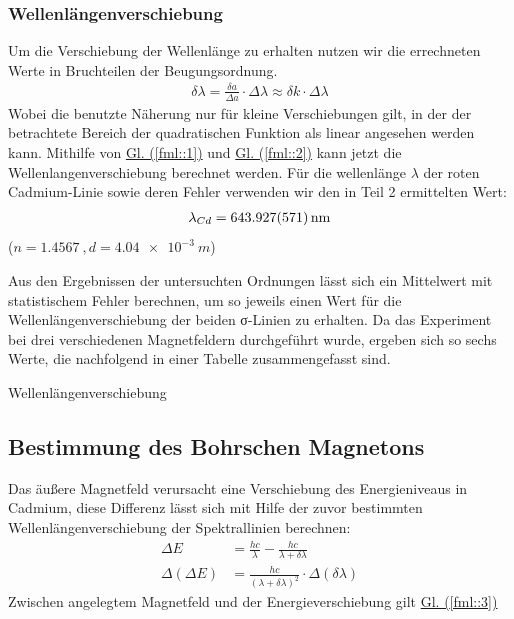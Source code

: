      \subsubsection{Wellenlängenverschiebung}
        Um die Verschiebung der Wellenlänge zu erhalten nutzen wir die errechneten Werte in Bruchteilen der Beugungsordnung.
        \begin{align}
          \delta \lambda = \frac{\delta a}{\Delta a}\cdot \Delta \lambda \approx \delta k\cdot \Delta\lambda \label{fml::2}
        \end{align}
        Wobei die benutzte Näherung nur für kleine Verschiebungen gilt, in der der betrachtete Bereich der quadratischen Funktion als linear angesehen werden kann. Mithilfe von \hyperref[fml::1]{Gl. (\ref*{fml::1})} %
        und \hyperref[fml::2]{Gl. (\ref*{fml::2})} kann jetzt die Wellenlangenverschiebung berechnet werden. Für die wellenlänge $\lambda$ der roten Cadmium-Linie sowie deren Fehler verwenden wir den in Teil 2 ermittelten Wert:
        \begin{align}
          \lambda_{Cd} = \SI{643.927+-0.571}{\nano\metre}
        \end{align}
        ($n = \SI{1.4567}{}, d=\SI{4.04e-3}{m}$)

        Aus den Ergebnissen der untersuchten Ordnungen lässt sich ein Mittelwert mit statistischem Fehler berechnen, um so jeweils einen Wert für die Wellenlängenverschiebung der beiden σ-Linien zu erhalten. Da das Experiment bei drei verschiedenen Magnetfeldern durchgeführt wurde, ergeben sich so sechs Werte, die nachfolgend in einer Tabelle zusammengefasst sind.
        \begin{table}[H]
          \centering
          
          \caption{Wellenlängenverschiebung}%
          \label{tab::1}
        \end{table}

      \subsection{Bestimmung des Bohrschen Magnetons}
        Das äußere Magnetfeld verursacht eine Verschiebung des Energieniveaus in Cadmium, diese Differenz lässt sich mit Hilfe der zuvor bestimmten Wellenlängenverschiebung der Spektrallinien berechnen:
        \begin{align}
          \Delta E         &= \frac{hc}\lambda-\frac{hc}{\lambda+\delta\lambda}\\
          \Delta(\Delta E) &= \frac{hc}{(\lambda+\delta\lambda)^2}\cdot\Delta(\delta\lambda)
        \end{align}
        Zwischen angelegtem Magnetfeld und der Energieverschiebung gilt \hyperref[fml::3]{Gl. (\ref*{fml::3})}%


